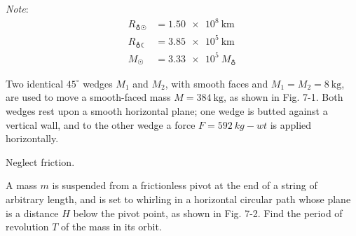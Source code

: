 \documentclass[../feynman-lectures-on-physics.tex]{subfiles}
\begin{document}
\begin{questions}
	\textit{Note}:
	\begin{align*}
		R_{\varEarth\Sun} &= \SI{1.50e8}{\kilo\meter} \\
		R_{\varEarth\leftmoon} &= \SI{3.85e5}{\kilo\meter} \\
		M_{\Sun} &= \SI{3.33e5}{M_{\varEarth}}
	\end{align*}
	
	\question Two identical $45^\circ$ wedges $M_1$ and $M_2$, with smooth faces
	and $M_1=M_2=\SI{8}{\kilo\gram}$, are used to move a smooth-faced mass $M =
	\SI{384}{\kilo\gram}$, as shown in Fig. 7-1. Both wedges rest upon a smooth
	horizontal plane; one wedge is butted against a vertical wall, and to the
	other wedge a force $F=\SI{592}{kg-wt}$ is applied horizontally.
	Neglect friction.
	
	\question A mass $m$ is suspended from a frictionless pivot at the end of a
	string of arbitrary length, and is set to whirling in a horizontal circular
	path whose plane is a distance $H$ below the pivot point, as shown in Fig.
	7-2. Find the period of revolution $T$ of the mass in its orbit.
	

\end{questions}
\end{document}
